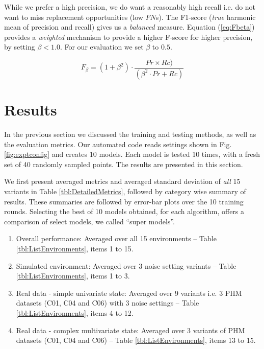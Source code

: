 \documentclass[a4paper, 12pt]{article}
\begin{document}
While we prefer a high precision, we do want a reasonably high recall i.e. do not want to miss replacement opportunities (low $FN$s). The F1-score (\textit{true} harmonic mean of precision and recall) gives us a \textit{balanced} measure. Equation (\ref{eq:Fbeta}) provides a \textit{weighted} mechanism to provide a higher F-score for higher precision, by setting $\beta < 1.0$. For our evaluation we set $\beta$ to $0.5$.

\begin{equation}
	F_{\beta} = (1+\beta^2) \cdot \frac{Pr \times Rc)}{(\beta^2 \cdot Pr + Rc)}
	\label{eq:Fbeta}
\end{equation}

%	

\section{Results}\label{sec:Results}
In the previous section we discussed the training and testing methods, as well as the evaluation metrics. Our automated code reads settings shown in Fig. \ref{fig:exptconfig} and creates 10 models. Each model is tested 10 times, with a fresh set of 40 randomly sampled points. The results are presented in this section.

We first present averaged metrics and averaged standard deviation of \textit{all} 15 variants in Table \ref{tbl:DetailedMetrics}, followed by category wise summary of results. These summaries are followed by error-bar plots over the 10 training rounds. Selecting the best of 10 models obtained, for each algorithm, offers a comparison of select models, we called ``super models''. 

\begin{enumerate}
	\item Overall performance: Averaged over all 15 environments -- Table \ref{tbl:ListEnvironments}, items 1 to 15.
	\item Simulated environment: Averaged over 3 noise setting variants -- Table \ref{tbl:ListEnvironments}, items 1 to 3.
	\item Real data - simple univariate state: Averaged over 9 variants i.e. 3 PHM datasets (C01, C04 and C06) with 3 noise settings -- Table \ref{tbl:ListEnvironments}, items 4 to 12. 
	\item Real data - complex multivariate state: Averaged over 3 variants of PHM datasets (C01, C04 and C06) -- Table \ref{tbl:ListEnvironments}, items 13 to 15. 
\end{enumerate}
\end{document}
